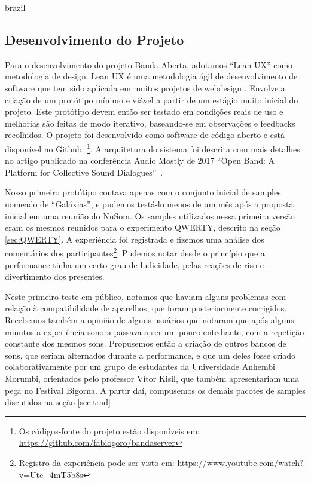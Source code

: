 \begin{otherlanguage*}{brazil}
\subsection{Desenvolvimento do Projeto}
Para o desenvolvimento do projeto Banda Aberta, adotamos ``Lean UX'' como metodologia de design. Lean UX é uma metodologia ágil de desenvolvimento de software que tem sido aplicada em muitos projetos de webdesign \cite{leanux}. Envolve a criação de um protótipo mínimo e viável a partir de um estágio muito inicial do projeto. Este protótipo devem então ser testado em condições reais de uso e melhorias são feitas de modo iterativo, baseando-se em observações e feedbacks recolhidos. O projeto foi desenvolvido como software de código aberto e está disponível no Github. \footnote{Os códigos-fonte do projeto estão disponíveis em: \url{https://github.com/fabiogoro/bandaserver}}. A arquitetura do sistema foi descrita com mais detalhes no artigo publicado na conferência Audio Mostly de 2017 ``Open Band: A Platform for Collective Sound Dialogues''~\cite{Stolfi2017}.

Nosso primeiro protótipo contava apenas com o conjunto inicial de samples nomeado de ``Galáxias'', e pudemos testá-lo menos de um mês após a proposta inicial em uma reunião do NuSom. Os samples utilizados nessa primeira versão eram os mesmos reunidos para o experimento QWERTY, descrito na seção \ref{sec:QWERTY}. A experiência foi registrada e fizemos uma análise dos comentários dos participantes\footnote{Registro da experiência pode ser visto em: \url{https://www.youtube.com/watch?v=Utc_4mT5b8s}}. Pudemos notar desde o princípio que a performance tinha um certo grau de ludicidade, pelas reações de riso e divertimento dos presentes. 


Neste primeiro teste em público, notamos que haviam alguns problemas com relação à compatibilidade de aparelhos, que foram posteriormente corrigidos. Recebemos também a opinião de alguns usuários que notaram que após alguns minutos a experiência sonora passava a ser um pouco entediante, com a repetição constante dos mesmos sons. Propusemos então a criação de outros bancos de sons, que seriam alternados durante a performance, e que um deles fosse criado colaborativamente por um grupo de estudantes da Universidade Anhembi Morumbi, orientados pelo professor Vítor Kisil,  que também apresentariam uma peça no Festival Bigorna. A partir daí, compusemos os demais pacotes de samples discutidos na seção \ref{sec:trad}


\end{otherlanguage*}
